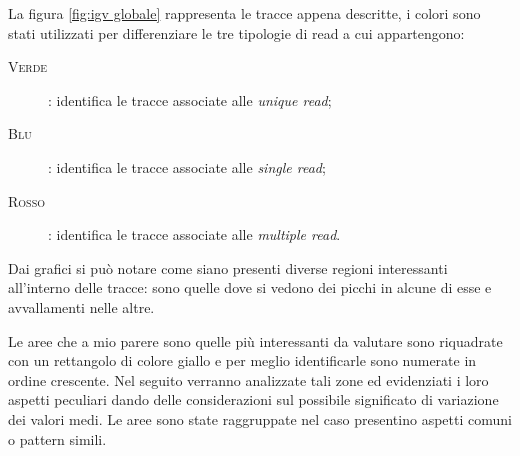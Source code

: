 La figura \ref{fig:igv globale} rappresenta le tracce appena descritte, i colori sono stati utilizzati per differenziare le tre tipologie di read a cui appartengono:
\begin{description}
\item[\textsc{Verde}]: identifica le tracce associate alle \emph{unique read};
\item[\textsc{Blu}]: identifica le tracce associate alle \emph{single read};
\item[\textsc{Rosso}]: identifica le tracce associate alle \emph{multiple read}.
\end{description}

Dai grafici si può notare come siano presenti diverse regioni interessanti all'interno delle tracce: sono quelle dove si vedono dei picchi in alcune di esse e avvallamenti nelle altre.

Le aree che a mio parere sono quelle più interessanti da valutare sono riquadrate con un rettangolo di colore giallo e per meglio identificarle sono numerate in ordine crescente.
Nel seguito verranno analizzate tali zone ed evidenziati i loro aspetti peculiari dando delle considerazioni sul possibile significato di variazione dei valori medi.
Le aree sono state raggruppate nel caso presentino aspetti comuni o pattern simili.

